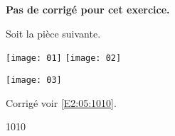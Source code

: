 \normaltrue \difficilefalse \tdifficilefalse
\correctionfalse


\setcounter{numques}{0}

\ifcorrection
\else
\textbf{Pas de corrigé pour cet exercice.}
\fi

\ifprof 
\else
Soit la pièce suivante.
\begin{center}
\texttt{[image: 01]}
\texttt{[image: 02]}
\end{center}
 \fi
 
\ifprof
\else 
\begin{center}
\texttt{[image: 03]}
\end{center}
\fi

\ifprof
\else
\begin{flushright}
\footnotesize{Corrigé  voir \ref{E2:05:1010}.}
\end{flushright}1010
\fi